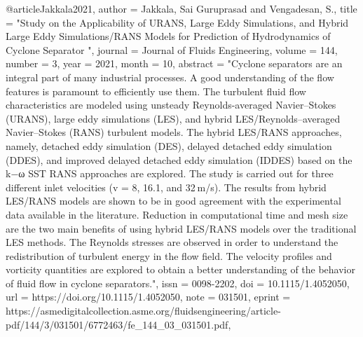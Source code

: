 @article{Jakkala2021,
    author = {Jakkala, Sai Guruprasad and Vengadesan, S.},
    title = "{Study on the Applicability of URANS, Large Eddy Simulations, and Hybrid Large Eddy Simulations/RANS Models for Prediction of Hydrodynamics of Cyclone Separator }",
    journal = {Journal of Fluids Engineering},
    volume = {144},
    number = {3},
    year = {2021},
    month = {10},
    abstract = "{Cyclone separators are an integral part of many industrial processes. A good understanding of the flow features is paramount to efficiently use them. The turbulent fluid flow characteristics are modeled using unsteady Reynolds-averaged Navier–Stokes (URANS), large eddy simulations (LES), and hybrid LES/Reynolds–averaged Navier–Stokes (RANS) turbulent models. The hybrid LES/RANS approaches, namely, detached eddy simulation (DES), delayed detached eddy simulation (DDES), and improved delayed detached eddy simulation (IDDES) based on the k−ω SST RANS approaches are explored. The study is carried out for three different inlet velocities (v = 8, 16.1, and 32 m/s). The results from hybrid LES/RANS models are shown to be in good agreement with the experimental data available in the literature. Reduction in computational time and mesh size are the two main benefits of using hybrid LES/RANS models over the traditional LES methods. The Reynolds stresses are observed in order to understand the redistribution of turbulent energy in the flow field. The velocity profiles and vorticity quantities are explored to obtain a better understanding of the behavior of fluid flow in cyclone separators.}",
    issn = {0098-2202},
    doi = {10.1115/1.4052050},
    url = {https://doi.org/10.1115/1.4052050},
    note = {031501},
    eprint = {https://asmedigitalcollection.asme.org/fluidsengineering/article-pdf/144/3/031501/6772463/fe\_144\_03\_031501.pdf},
}
